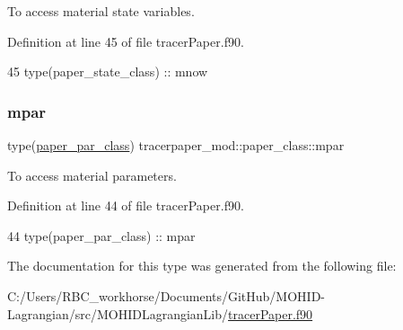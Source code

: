 To access material state variables. 



Definition at line 45 of file tracer\+Paper.\+f90.


\begin{DoxyCode}
45         \textcolor{keywordtype}{type}(paper\_state\_class) :: mnow
\end{DoxyCode}
\mbox{\label{structtracerpaper__mod_1_1paper__class_a26cdff9536d77341f4c2d815400a7a86}} 
\subsubsection{\texorpdfstring{mpar}{mpar}}
{\footnotesize\ttfamily type(\mbox{\hyperlink{structtracerpaper__mod_1_1paper__par__class}{paper\+\_\+par\+\_\+class}}) tracerpaper\+\_\+mod\+::paper\+\_\+class\+::mpar\hspace{0.3cm}{\ttfamily [private]}}



To access material parameters. 



Definition at line 44 of file tracer\+Paper.\+f90.


\begin{DoxyCode}
44         \textcolor{keywordtype}{type}(paper\_par\_class)   :: mpar
\end{DoxyCode}


The documentation for this type was generated from the following file\+:\begin{DoxyCompactItemize}
\item 
C\+:/\+Users/\+R\+B\+C\+\_\+workhorse/\+Documents/\+Git\+Hub/\+M\+O\+H\+I\+D-\/\+Lagrangian/src/\+M\+O\+H\+I\+D\+Lagrangian\+Lib/\mbox{\hyperlink{tracer_paper_8f90}{tracer\+Paper.\+f90}}\end{DoxyCompactItemize}
